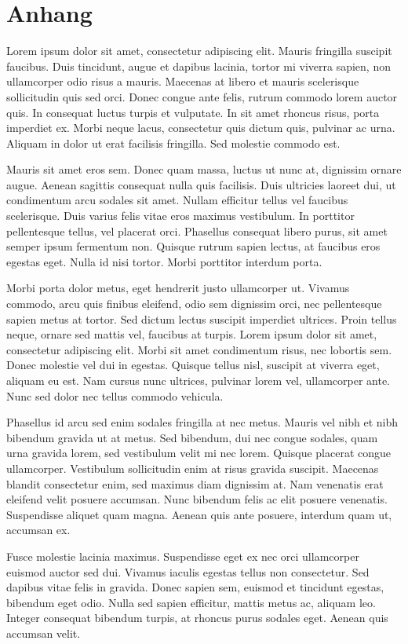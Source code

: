 \section{Anhang}
Lorem ipsum dolor sit amet, consectetur adipiscing elit. Mauris fringilla suscipit faucibus. Duis tincidunt, augue et dapibus lacinia, tortor mi viverra sapien, non ullamcorper odio risus a mauris. Maecenas at libero et mauris scelerisque sollicitudin quis sed orci. Donec congue ante felis, rutrum commodo lorem auctor quis. In consequat luctus turpis et vulputate. In sit amet rhoncus risus, porta imperdiet ex. Morbi neque lacus, consectetur quis dictum quis, pulvinar ac urna. Aliquam in dolor ut erat facilisis fringilla. Sed molestie commodo est.

Mauris sit amet eros sem. Donec quam massa, luctus ut nunc at, dignissim ornare augue. Aenean sagittis consequat nulla quis facilisis. Duis ultricies laoreet dui, ut condimentum arcu sodales sit amet. Nullam efficitur tellus vel faucibus scelerisque. Duis varius felis vitae eros maximus vestibulum. In porttitor pellentesque tellus, vel placerat orci. Phasellus consequat libero purus, sit amet semper ipsum fermentum non. Quisque rutrum sapien lectus, at faucibus eros egestas eget. Nulla id nisi tortor. Morbi porttitor interdum porta.

Morbi porta dolor metus, eget hendrerit justo ullamcorper ut. Vivamus commodo, arcu quis finibus eleifend, odio sem dignissim orci, nec pellentesque sapien metus at tortor. Sed dictum lectus suscipit imperdiet ultrices. Proin tellus neque, ornare sed mattis vel, faucibus at turpis. Lorem ipsum dolor sit amet, consectetur adipiscing elit. Morbi sit amet condimentum risus, nec lobortis sem. Donec molestie vel dui in egestas. Quisque tellus nisl, suscipit at viverra eget, aliquam eu est. Nam cursus nunc ultrices, pulvinar lorem vel, ullamcorper ante. Nunc sed dolor nec tellus commodo vehicula.

Phasellus id arcu sed enim sodales fringilla at nec metus. Mauris vel nibh et nibh bibendum gravida ut at metus. Sed bibendum, dui nec congue sodales, quam urna gravida lorem, sed vestibulum velit mi nec lorem. Quisque placerat congue ullamcorper. Vestibulum sollicitudin enim at risus gravida suscipit. Maecenas blandit consectetur enim, sed maximus diam dignissim at. Nam venenatis erat eleifend velit posuere accumsan. Nunc bibendum felis ac elit posuere venenatis. Suspendisse aliquet quam magna. Aenean quis ante posuere, interdum quam ut, accumsan ex.

Fusce molestie lacinia maximus. Suspendisse eget ex nec orci ullamcorper euismod auctor sed dui. Vivamus iaculis egestas tellus non consectetur. Sed dapibus vitae felis in gravida. Donec sapien sem, euismod et tincidunt egestas, bibendum eget odio. Nulla sed sapien efficitur, mattis metus ac, aliquam leo. Integer consequat bibendum turpis, at rhoncus purus sodales eget. Aenean quis accumsan velit.